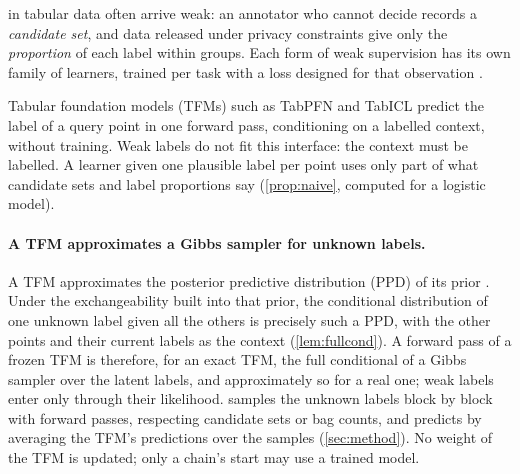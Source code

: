 
 in tabular data often arrive weak: an annotator who cannot decide records a \emph{candidate set}, and data
released under privacy constraints give only the \emph{proportion} of each label within groups. Each form of weak
supervision has its own family of learners, trained per task with a loss designed for that observation \citep{proden,feng2020provably,dllp,tsai2020llpvat,glws}.

Tabular foundation models (TFMs) such as TabPFN \citep{hollmann2023tabpfn,tabpfn_nature} and TabICL
\citep{qu2025tabicl,tabicl_v2} predict the label of a query point in one forward pass, conditioning on a labelled
context, without training. Weak labels do not fit this interface: the context must be labelled. A learner given one
plausible label per point uses only part of what candidate sets and label proportions say (\cref{prop:naive}, computed
for a logistic model).

\paragraph{A TFM approximates a Gibbs sampler for unknown labels.} A TFM approximates the posterior predictive distribution
(PPD) of its prior \citep{muller2022pfn}. Under the exchangeability built into that prior, the conditional distribution
of one unknown label given all the others is precisely such a PPD, with the other points and their current labels as
the context (\cref{lem:fullcond}). A forward pass of a frozen TFM is therefore, for an exact TFM, the full conditional
of a Gibbs sampler over the latent labels, and approximately so for a real one; weak labels enter only through their
likelihood. \ours{} samples the unknown labels block
by block with forward passes, respecting candidate sets or bag counts, and predicts by averaging the TFM's predictions
over the samples (\cref{sec:method}). No weight of the TFM is updated; only a chain's start may use a trained model.

